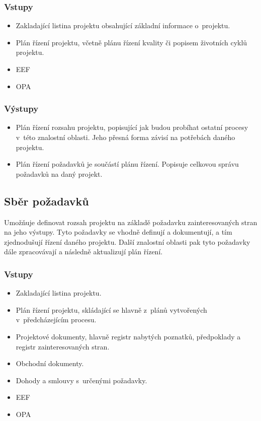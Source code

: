 \subsubsection*{Vstupy}
\begin{itemize}
    \item Zakladající listina projektu obsahující základní informace o~projektu.
    \item Plán řízení projektu, včetně plánu řízení kvality či popisem životních cyklů projektu.
    \item EEF
    \item OPA
\end{itemize}
\subsubsection*{Výstupy}
\begin{itemize}
    \item Plán řízení rozsahu projektu, popisující jak budou probíhat ostatní procesy v~této znalostní oblasti. Jeho přesná forma závisí na potřebách daného projektu.
    \item Plán řízení požadavků je součástí plánu řízení. Popisuje celkovou správu požadavků na daný projekt.
\end{itemize}

\subsection*{Sběr požadavků}

Umožňuje definovat rozsah projektu na základě požadavku zainteresovaných stran na jeho výstupy. Tyto požadavky se vhodně definují a dokumentují, a tím zjednodušují řízení daného projektu. Další znalostní oblasti pak tyto požadavky dále zpracovávají a následně aktualizují plán řízení.

\subsubsection*{Vstupy}
\begin{itemize}
    \item Zakladající listina projektu.
    \item Plán řízení projektu, skládající se hlavně z~plánů vytvořených v~předcházejícím procesu.
    \item Projektové dokumenty, hlavně registr nabytých poznatků, předpoklady a registr zainteresovaných stran.
    \item Obchodní dokumenty.
    \item Dohody a smlouvy s~určenými požadavky.
    \item EEF
    \item OPA
\end{itemize}
